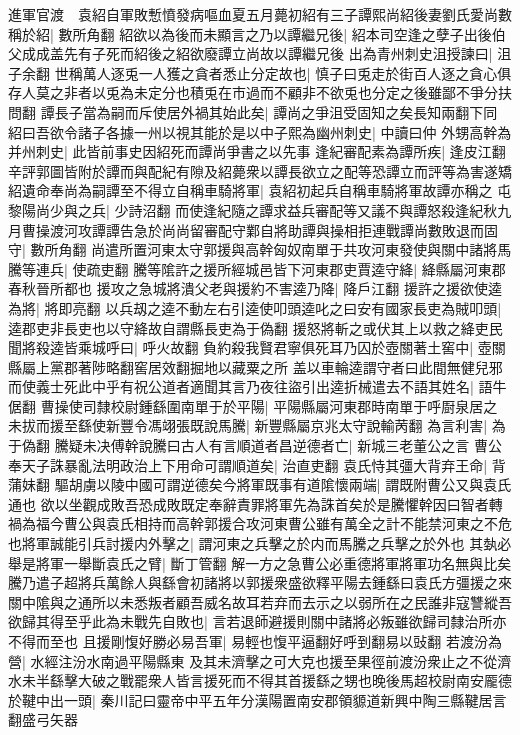 進軍官渡　袁紹自軍敗慙憤發病嘔血夏五月薨初紹有三子譚熙尚紹後妻劉氏愛尚數稱於紹|{
	數所角翻}
紹欲以為後而未顯言之乃以譚繼兄後|{
	紹本司空逢之孽子出後伯父成成盖先有子死而紹後之紹欲廢譚立尚故以譚繼兄後}
出為青州刺史沮授諫曰|{
	沮子余翻}
世稱萬人逐兎一人獲之貪者悉止分定故也|{
	慎子曰兎走於街百人逐之貪心俱存人莫之非者以兎為未定分也積兎在市過而不顧非不欲兎也分定之後雖鄙不爭分扶問翻}
譚長子當為嗣而斥使居外禍其始此矣|{
	譚尚之爭沮受固知之矣長知兩翻下同}
紹曰吾欲令諸子各據一州以視其能於是以中子熙為幽州刺史|{
	中讀曰仲}
外甥高幹為并州刺史|{
	此皆前事史因紹死而譚尚爭書之以先事}
逢紀審配素為譚所疾|{
	逢皮江翻}
辛評郭圖皆附於譚而與配紀有隙及紹薨衆以譚長欲立之配等恐譚立而評等為害遂矯紹遺命奉尚為嗣譚至不得立自稱車騎將軍|{
	袁紹初起兵自稱車騎將軍故譚亦稱之}
屯黎陽尚少與之兵|{
	少詩沼翻}
而使逢紀隨之譚求益兵審配等又議不與譚怒殺逢紀秋九月曹操渡河攻譚譚告急於尚尚留審配守鄴自將助譚與操相拒連戰譚尚數敗退而固守|{
	數所角翻}
尚遣所置河東太守郭援與高幹匈奴南單于共攻河東發使與關中諸將馬騰等連兵|{
	使疏吏翻}
騰等隂許之援所經城邑皆下河東郡吏賈逵守絳|{
	絳縣屬河東郡春秋晉所都也}
援攻之急城將潰父老與援約不害逵乃降|{
	降戶江翻}
援許之援欲使逵為將|{
	將即亮翻}
以兵刼之逵不動左右引逵使叩頭逵叱之曰安有國家長吏為賊叩頭|{
	逵郡吏非長吏也以守絳故自謂縣長吏為于偽翻}
援怒將斬之或伏其上以救之絳吏民聞將殺逵皆乘城呼曰|{
	呼火故翻}
負約殺我賢君寧俱死耳乃囚於壺關著土窖中|{
	壺關縣屬上黨郡著陟略翻窖居效翻掘地以藏粟之所}
盖以車輪逵謂守者曰此間無健兒邪而使義士死此中乎有祝公道者適聞其言乃夜往盜引出逵折械遣去不語其姓名|{
	語牛倨翻}
曹操使司隸校尉鍾繇圍南單于於平陽|{
	平陽縣屬河東郡時南單于呼㕑泉居之}
未拔而援至繇使新豐令馮翊張既說馬騰|{
	新豐縣屬京兆太守說輸苪翻}
為言利害|{
	為于偽翻}
騰疑未决傅幹說騰曰古人有言順道者昌逆德者亡|{
	新城三老董公之言}
曹公奉天子誅暴亂法明政治上下用命可謂順道矣|{
	治直吏翻}
袁氏恃其彊大背弃王命|{
	背蒲妹翻}
驅胡虜以陵中國可謂逆德矣今將軍既事有道隂懷兩端|{
	謂既附曹公又與袁氏通也}
欲以坐觀成敗吾恐成敗既定奉辭責罪將軍先為誅首矣於是騰懼幹因曰智者轉禍為福今曹公與袁氏相持而高幹郭援合攻河東曹公雖有萬全之計不能禁河東之不危也將軍誠能引兵討援内外擊之|{
	謂河東之兵擊之於内而馬騰之兵擊之於外也}
其埶必舉是將軍一舉斷袁氏之臂|{
	斷丁管翻}
解一方之急曹公必重德將軍將軍功名無與比矣騰乃遣子超將兵萬餘人與繇會初諸將以郭援衆盛欲釋平陽去鍾繇曰袁氏方彊援之來關中隂與之通所以未悉叛者顧吾威名故耳若弃而去示之以弱所在之民誰非寇讐縱吾欲歸其得至乎此為未戰先自敗也|{
	言若退師避援則關中諸將必叛雖欲歸司隸治所亦不得而至也}
且援剛愎好勝必易吾軍|{
	易輕也愎平逼翻好呼到翻易以䜴翻}
若渡汾為營|{
	水經注汾水南過平陽縣東}
及其未濟擊之可大克也援至果徑前渡汾衆止之不從濟水未半繇擊大破之戰罷衆人皆言援死而不得其首援繇之甥也晚後馬超校尉南安龎德於鞬中出一頭|{
	秦川記曰靈帝中平五年分漢陽置南安郡領䝠道新興中陶三縣鞬居言翻盛弓矢器}

